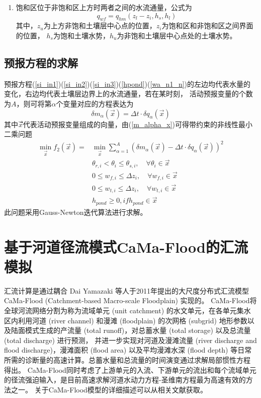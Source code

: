 \begin{enumerate}
    \item 饱和区位于非饱和区上方时两者之间的水流通量，公式为
    \begin{equation}
    q_{w f}=q_{h m}\left(z_{l}-z_{i}, h_{s}, h_{l}\right)
    \end{equation}
    其中，$z_u$为上方非饱和土壤层中心点的位置，$z_i$为饱和区和非饱和区之间界面的位置，
    $h_s$为饱和土壤水势，$h_u$为非饱和土壤层中心点处的土壤水势。
\end{enumerate}


\subsection{预报方程的求解}
预报方程(\ref{si_in1})(\ref{si_in2})(\ref{si_in3})(\ref{hpond})(\ref{wa_n1_n})的左边均代表水量的变化，右边均代表土壤层边界上的水流通量，若在某时刻，
活动预报变量的个数为$A$，则可将第$\alpha$个变量对应的方程表达为
\begin{equation}\label{m_alpha_x}
\delta m_{\alpha}(\vec{x})=\Delta t \cdot \delta q_{\alpha}(\vec{x})
\end{equation}
其中$\vec{x}$⃗代表活动预报变量组成的向量，由(\ref{m_alpha_x})可得带约束的非线性最小二乘问题
\begin{equation}
\begin{aligned} \min _{\vec{x}} f_{2}(\vec{x})=& \min _{\vec{x}} \sum_{\alpha=1}^{A}\left(\delta m_{\alpha}(\vec{x})-\Delta t \cdot \delta q_{\alpha}(\vec{x})\right)^{2} \\ & \theta_{r, i}<\theta_{i} \leq \theta_{s, i}, \quad \forall \theta_{i} \in \vec{x} \\ & 0 \leq w_{f, i} \leq \Delta z_{i}, \quad \forall w_{f, i} \in \vec{x} \\ & 0 \leq w_{t, i} \leq \Delta z_{i}, \quad \forall w_{t, i} \in \vec{x} \\ & h_{ {pond }} \geq 0,  { if } h_{ {pond }} \in \vec{x} \end{aligned}
\end{equation}
此问题采用Gauss-Newton迭代算法进行求解。

\section{基于河道径流模式CaMa-Flood的汇流模拟}
汇流计算是通过耦合 Dai Yamazaki 等人于2011年提出的大尺度分布式汇流模型 CaMa-Flood (Catchment-based Macro-scale Floodplain) 实现的\citep{yamazaki2011physically}。
CaMa-Flood将全球河流网络分割为称为流域单元 (unit catchment) 的水文单元，在各单元集水区内利用河道 (river channel) 和漫滩 (floodplain) 的次网格 (subgrid) 
地形参数以及陆面模式生成的产流量 (total runoff)，对总蓄水量 (total storage) 以及总流量 (total discharge) 进行预测，
并进一步实现对河道及漫滩流量 (river discharge and flood discharge)，漫滩面积 (flood area) 以及平均漫滩水深 (flood depth) 
等日常所需的诊断量的高速计算。总蓄水量和总流量的时间演变通过求解局部惯性方程 \citep{bates2010} 得出。
CaMa-Flood同时考虑了上游单元的入流、下游单元的流出和每个流域单元的径流强迫输入，是目前高速求解河道水动力方程-圣维南方程最为高速有效的方法之一。
关于CaMa-Flood模型的详细描述可以从相关文献获取\citep{yamazaki2011physically,yamazaki2013improving,yamazaki2014regional,yamazaki2014development}。


